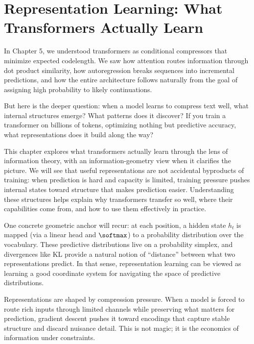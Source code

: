
\chapter[Representation Learning]{Representation Learning: What Transformers Actually Learn}
\label{ch:representation_learning}

\vspace{1em}

In Chapter 5, we understood transformers as conditional compressors that minimize expected codelength. We saw how attention routes information through dot product similarity, how autoregression breaks sequences into incremental predictions, and how the entire architecture follows naturally from the goal of assigning high probability to likely continuations.

But here is the deeper question: when a model learns to compress text well, what internal structures emerge? What patterns does it discover? If you train a transformer on billions of tokens, optimizing nothing but predictive accuracy, what representations does it build along the way?

This chapter explores what transformers actually learn through the lens of information theory, with an information-geometry view when it clarifies the picture. We will see that useful representations are not accidental byproducts of training: when prediction is hard and capacity is limited, training pressure pushes internal states toward structure that makes prediction easier. Understanding these structures helps explain why transformers transfer so well, where their capabilities come from, and how to use them effectively in practice.

One concrete geometric anchor will recur: at each position, a hidden state $h_t$ is mapped (via a linear head and $\softmax$) to a probability distribution over the vocabulary. These predictive distributions live on a probability simplex, and divergences like KL provide a natural notion of ``distance'' between what two representations predict. In that sense, representation learning can be viewed as learning a good coordinate system for navigating the space of predictive distributions.

\vspace{2em}

\begin{keyinsight}
Representations are shaped by compression pressure. When a model is forced to route rich inputs through limited channels while preserving what matters for prediction, gradient descent pushes it toward encodings that capture stable structure and discard nuisance detail. This is not magic; it is the economics of information under constraints.
\end{keyinsight}

